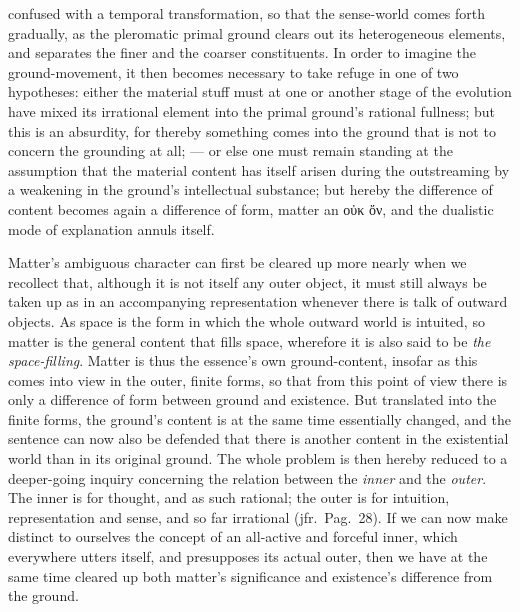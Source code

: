 \documentclass[12pt]{book}
\begin{document}
confused with a temporal transformation, so that the sense-world comes forth
gradually, as the pleromatic primal ground clears out its heterogeneous
elements, and separates the finer and the coarser constituents. In order to
imagine the ground-movement, it then becomes necessary to take refuge in one
of two hypotheses: either the material stuff must at one or another stage of
the evolution have mixed its irrational element into the primal ground's
rational fullness; but this is an absurdity, for thereby something comes
into the ground that is not to concern the grounding at all; --- or else one
must remain standing at the assumption that the material content has itself
arisen during the outstreaming by a weakening in the ground's intellectual
substance; but hereby the difference of content becomes again a difference
of form, matter an οὐκ ὄν, and the dualistic mode of explanation annuls
itself.

Matter's ambiguous character can first be cleared up more nearly when we
recollect that, although it is not itself any outer object, it must still
always be taken up as in an accompanying representation whenever there is
talk of outward objects. As space is the form in which the whole outward
world is intuited, so matter is the general content that fills space,
wherefore it is also said to be \emph{the space-filling}. Matter is thus the
essence's own ground-content, insofar as this comes into view in the outer,
finite forms, so that from this point of view there is only a difference of
form between ground and existence. But translated into the finite forms, the
ground's content is at the same time essentially changed, and the sentence
can now also be defended that there is another content in the existential
world than in its original ground. The whole problem is then hereby reduced
to a deeper-going inquiry concerning the relation between the \emph{inner}
and the \emph{outer}. The inner is for thought, and as such rational; the
outer is for intuition, representation and sense, and so far irrational
(jfr.\ Pag.\ 28). If we can now make distinct to ourselves the concept of an
all-active and forceful inner, which everywhere utters itself, and
presupposes its actual outer, then we have at the same time cleared up both
matter's significance and existence's difference from the ground.
\end{document}
